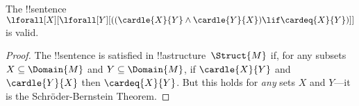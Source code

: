 \documentclass[../../../include/open-logic-section]{subfiles}
\begin{document}
\begin{prop}
The !!{sentence} $\lforall[X][\lforall[Y][((\cardle{X}{Y} \land
    \cardle{Y}{X}) \lif \cardeq{X}{Y})]]$ is valid.
\end{prop}

\begin{proof}
The !!{sentence} is satisfied in !!a{structure}~$\Struct{M}$ if, for
any subsets $X \subseteq \Domain{M}$ and $Y \subseteq \Domain{M}$, if
$\cardle{X}{Y}$ and $\cardle{Y}{X}$ then $\cardeq{X}{Y}$.  But this
holds for \emph{any} sets $X$ and $Y$---it is the Schr\"oder-Bernstein
Theorem.
\end{proof}
\end{document}

